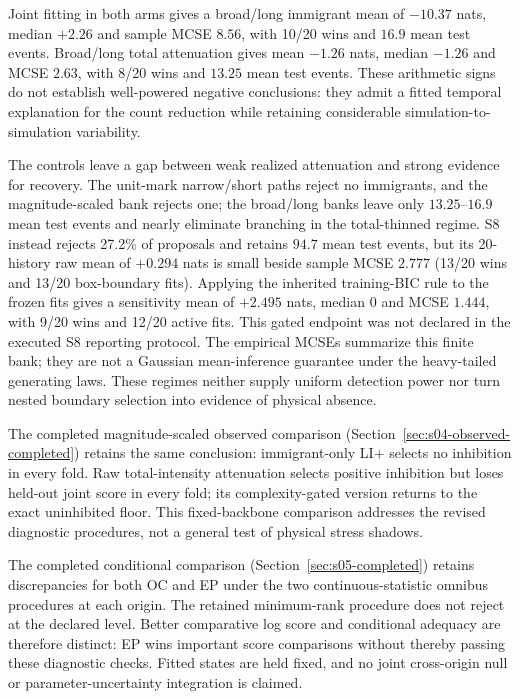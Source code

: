 Joint fitting in both arms gives a broad/long immigrant mean of $-10.37$ nats, median $+2.26$ and sample MCSE $8.56$, with 10/20 wins and $16.9$ mean test events. Broad/long total attenuation gives mean $-1.26$ nats, median $-1.26$ and MCSE $2.63$, with 8/20 wins and $13.25$ mean test events. These arithmetic signs do not establish well-powered negative conclusions: they admit a fitted temporal explanation for the count reduction while retaining considerable simulation-to-simulation variability.

The controls leave a gap between weak realized attenuation and strong evidence for recovery. The unit-mark narrow/short paths reject no immigrants, and the magnitude-scaled bank rejects one; the broad/long banks leave only $13.25$--$16.9$ mean test events and nearly eliminate branching in the total-thinned regime. S8 instead rejects 27.2\% of proposals and retains $94.7$ mean test events, but its 20-history raw mean of $+0.294$ nats is small beside sample MCSE $2.777$ (13/20 wins and 13/20 box-boundary fits). Applying the inherited training-BIC rule to the frozen fits gives a sensitivity mean of $+2.495$ nats, median $0$ and MCSE $1.444$, with 9/20 wins and 12/20 active fits. This gated endpoint was not declared in the executed S8 reporting protocol. The empirical MCSEs summarize this finite bank; they are not a Gaussian mean-inference guarantee under the heavy-tailed generating laws. These regimes neither supply uniform detection power nor turn nested boundary selection into evidence of physical absence.

The completed magnitude-scaled observed comparison (Section~\ref{sec:s04-observed-completed}) retains the same conclusion: immigrant-only LI+ selects no inhibition in every fold. Raw total-intensity attenuation selects positive inhibition but loses held-out joint score in every fold; its complexity-gated version returns to the exact uninhibited floor. This fixed-backbone comparison addresses the revised diagnostic procedures, not a general test of physical stress shadows.

The completed conditional comparison (Section~\ref{sec:s05-completed}) retains discrepancies for both OC and EP under the two continuous-statistic omnibus procedures at each origin. The retained minimum-rank procedure does not reject at the declared level. Better comparative log score and conditional adequacy are therefore distinct: EP wins important score comparisons without thereby passing these diagnostic checks. Fitted states are held fixed, and no joint cross-origin null or parameter-uncertainty integration is claimed.

